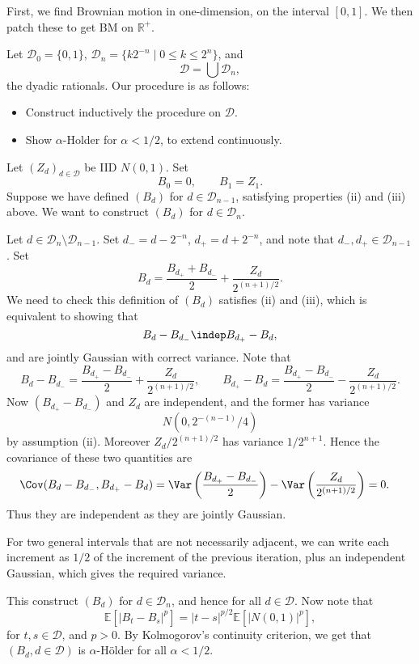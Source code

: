 \documentclass[12pt]{article}
\begin{document}
\begin{proofbox}
	First, we find Brownian motion in one-dimension, on the interval $[0, 1]$. We then patch these to get BM on $\mathbb{R}^+$.

	Let $\mathcal{D}_0 = \{0, 1\}$, $\mathcal{D}_n = \{k 2^{-n} \mid 0 \leq k \leq 2^n\}$, and
	\[
	\mathcal{D} = \bigcup \mathcal{D}_n,
	\]
	the dyadic rationals. Our procedure is as follows:
	\begin{itemize}
		\item Construct inductively the procedure on $\mathcal{D}$.
		\item Show $\alpha$-Holder for $\alpha < 1/2$, to extend continuously.
	\end{itemize}
	Let $(Z_d)_{d \in \mathcal{D}}$ be IID $N(0, 1)$. Set
	\[
	B_0 = 0,\qquad B_1 = Z_1.
	\]
	Suppose we have defined $(B_d)$ for $d \in \mathcal{D}_{n-1}$, satisfying properties (ii) and (iii) above. We want to construct $(B_d)$ for $d \in \mathcal{D}_n$.

	Let $d \in \mathcal{D}_n \setminus \mathcal{D}_{n-1}$. Set $d_- = d - 2^{-n}$, $d_+ = d + 2^{-n}$, and note that $d_-, d_+ \in \mathcal{D}_{n-1}$. Set
	\[
	B_d = \frac{B_{d_+} + B_{d_-}}{2} + \frac{Z_d}{2^{(n+1)/2}}.
	\]
	We need to check this definition of $(B_d)$ satisfies (ii) and (iii), which is equivalent to showing that
	\[
	B_{d} - B_{d_-} \indep B_{d_+} - B_d,
	\]
	and are jointly Gaussian with correct variance. Note that
	\[
	B_{d} - B_{d_-} = \frac{B_{d_+} - B_{d_-}}{2} + \frac{Z_d}{2^{(n+1)/2}}, \qquad B_{d_+} - B_d = \frac{B_{d_+} - B_{d_-}}{2} - \frac{Z_d}{2^{(n+1)/2}}.
	\]
	Now $(B_{d_+} - B_{d_-})$ and $Z_d$ are independent, and the former has variance
	\[
	N(0, 2^{-(n-1)}/4)
	\]
	by assumption (ii). Moreover $Z_d/2^{(n+1)/2}$ has variance $1/2^{n+1}$. Hence the covariance of these two quantities are
	\begin{align*}
		\Cov(B_d - B_{d_-} , B_{d_+} - B_d) &= \Var \left( \frac{B_{d_+} - B_{d_-}}{2} \right) - \Var \left( \frac{Z_d}{2^{(n+1)/2}} \right) = 0.
	\end{align*}
	Thus they are independent as they are jointly Gaussian.

	For two general intervals that are not necessarily adjacent, we can write each increment as $1/2$ of the increment of the previous iteration, plus an independent Gaussian, which gives the required variance.

	This construct $(B_d)$ for $d \in \mathcal{D}_n$, and hence for all $d \in \mathcal{D}$. Now note that
	\[
	\mathbb{E}[|B_t - B_s|^{p}] = |t - s|^{p/2} \mathbb{E}[|N(0, 1)|^{p}],
	\]
	for $t, s \in \mathcal{D}$, and $p > 0$. By Kolmogorov's continuity criterion, we get that $(B_d, d \in \mathcal{D})$ is $\alpha$-H\"older for all $\alpha < 1/2$.


\end{proofbox}
\end{document}
